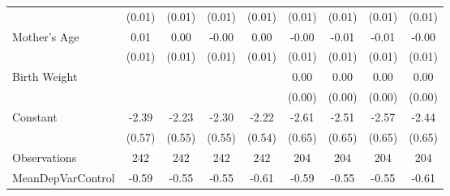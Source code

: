 {\begin{tabular}{l*{8}{c}}
                    &      (0.01)         &      (0.01)         &      (0.01)         &      (0.01)         &      (0.01)         &      (0.01)         &      (0.01)         &      (0.01)         \\
[1em]
Mother's Age        &        0.01         &        0.00         &       -0.00         &        0.00         &       -0.00         &       -0.01         &       -0.01         &       -0.00         \\
                    &      (0.01)         &      (0.01)         &      (0.01)         &      (0.01)         &      (0.01)         &      (0.01)         &      (0.01)         &      (0.01)         \\
[1em]
Birth Weight        &                     &                     &                     &                     &        0.00\sym{*}  &        0.00         &        0.00         &        0.00         \\
                    &                     &                     &                     &                     &      (0.00)         &      (0.00)         &      (0.00)         &      (0.00)         \\
[1em]
Constant            &       -2.39\sym{***}&       -2.23\sym{***}&       -2.30\sym{***}&       -2.22\sym{***}&       -2.61\sym{***}&       -2.51\sym{***}&       -2.57\sym{***}&       -2.44\sym{***}\\
                    &      (0.57)         &      (0.55)         &      (0.55)         &      (0.54)         &      (0.65)         &      (0.65)         &      (0.65)         &      (0.65)         \\
\hline
Observations        &         242         &         242         &         242         &         242         &         204         &         204         &         204         &         204         \\
MeanDepVarControl   &       -0.59         &       -0.55         &       -0.55         &       -0.61         &       -0.59         &       -0.55         &       -0.55         &       -0.61         \\
\hline\hline
\end{tabular}
}
